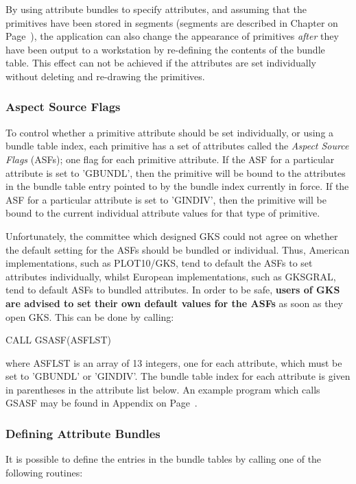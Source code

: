 By using attribute bundles to specify attributes, and assuming that
the primitives have been stored in segments
(segments are described in Chapter on Page~\pageref{sec:seghdr}),
the application can also change the appearance of primitives
{\it after} they have been output to a workstation by
re-defining the contents of the bundle table.
This effect can not be achieved if the
attributes are set individually without deleting and re-drawing
the primitives.
\subsubsection{Aspect Source Flags}
 
To control whether a primitive attribute should be set individually,
or using a bundle table index, each primitive has a set of attributes
called the {\it Aspect Source Flags} (ASFs);
one flag for each primitive attribute.
If the ASF for a particular attribute is set to 'GBUNDL',
then the primitive will be bound to the attributes in the bundle table
entry pointed to by the bundle index currently in force.
If the ASF for a particular attribute is set to 'GINDIV',
then the primitive will be bound to the current individual attribute values
for that type of primitive.
 
Unfortunately, the committee which designed GKS could not agree on
whether the default setting for the ASFs should be bundled or individual.
Thus, American implementations, such as PLOT10/GKS, tend to default
the ASFs to set attributes individually, whilst European implementations,
such as GKSGRAL, tend to default ASFs to bundled attributes.
In order to be safe, {\bf users of GKS are advised to set their own default
values for the ASFs} as soon as they open GKS.
This can be done by calling:
\begin{XMP}
CALL GSASF(ASFLST)
\end{XMP}
where ASFLST is an array of 13 integers, one for each attribute,
which must be set to 'GBUNDL' or 'GINDIV'.
The bundle table index for each attribute is given in parentheses
in the attribute list below.
An example program which calls GSASF may be
found in Appendix on Page~\pageref{sec:expfa}.
\subsubsection{Defining Attribute Bundles}
 
It is possible to define the entries in the bundle tables by calling one
of the following routines:
 
